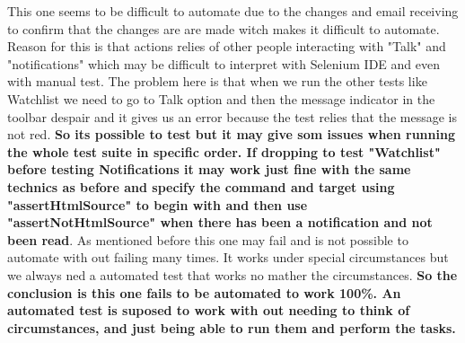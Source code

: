 \documentclass[a4paper,10pt]{article}
\begin{document}
This one seems to be difficult to automate due to the changes and email receiving to confirm that the changes are 
are made witch makes it difficult to automate. Reason for this is that actions relies of other people interacting with "Talk"
and "notifications" which may be difficult to interpret with Selenium IDE and even with manual test. The problem here is that when we run
the other tests like Watchlist we need to go to Talk option and then the message indicator in the toolbar despair and it gives us an error
because the test relies that the message is not red. \textbf{\color{red} So its possible to test but it may give som issues when running the whole test suite in
specific order. If dropping to test "Watchlist" before testing Notifications it may work just fine with the same technics as before
and specify the command and target using "assertHtmlSource" to begin with and then use  "assertNotHtmlSource" when there has been a
notification and not been read}. As mentioned before this one may fail and is not possible to automate with out failing many times.
It works under special circumstances but we always ned a automated test that works no mather the circumstances. \textbf{\color{red}So the conclusion is
this one fails to be automated to work 100\%. 
An automated test is suposed to work with out needing to think of circumstances, and just being able to run them and perform the tasks.}
\end{document}
